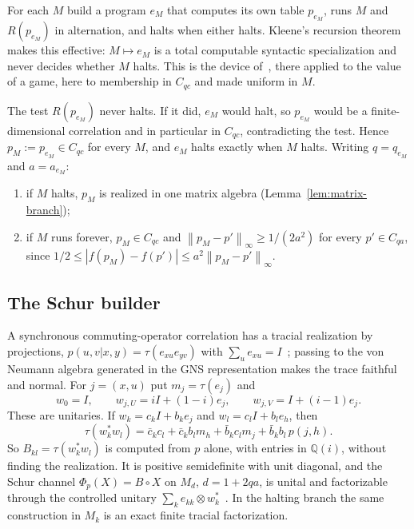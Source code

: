 \documentclass[11pt]{article}
\theoremstyle{definition}
\theoremstyle{remark}
\newcommand{\norm}[1]{\left\lVert#1\right\rVert}
\begin{document}
For each $M$ build a program $e_M$ that computes its own table $p_{e_M}$, runs $M$ and $R(p_{e_M})$ in alternation, and halts when either halts. Kleene's recursion theorem makes this effective: $M\mapsto e_M$ is a total computable syntactic specialization and never decides whether $M$ halts. This is the device of~\cite[Section~4.2]{FanizzaEtAl}, there applied to the value of a game, here to membership in $C_{qc}$ and made uniform in $M$.

The test $R(p_{e_M})$ never halts. If it did, $e_M$ would halt, so $p_{e_M}$ would be a finite-dimensional correlation and in particular in $C_{qc}$, contradicting the test. Hence $p_M:=p_{e_M}\in C_{qc}$ for every $M$, and $e_M$ halts exactly when $M$ halts. Writing $q=q_{e_M}$ and $a=a_{e_M}$:
\begin{enumerate}[label=(\roman*),itemsep=2pt]
\item if $M$ halts, $p_M$ is realized in one matrix algebra (Lemma~\ref{lem:matrix-branch});
\item if $M$ runs forever, $p_M\in C_{qc}$ and $\norm{p_M-p'}_\infty\ge1/(2a^2)$ for every $p'\in C_{qa}$, since $1/2\le|f(p_M)-f(p')|\le a^2\norm{p_M-p'}_\infty$.
\end{enumerate}

\subsection{The Schur builder}

A synchronous commuting-operator correlation has a tracial realization by projections, $p(u,v|x,y)=\tau(e_{xu}e_{yv})$ with $\sum_ue_{xu}=I$~\cite[Theorem~5.5 and Corollary~5.6]{PSSTW}; passing to the von Neumann algebra generated in the GNS representation makes the trace faithful and normal. For $j=(x,u)$ put $m_j=\tau(e_j)$ and
\[
 w_0=I,\qquad w_{j,U}=iI+(1-i)e_j,\qquad w_{j,V}=I+(i-1)e_j.
\]
These are unitaries. If $w_k=c_kI+b_ke_j$ and $w_l=c_lI+b_le_h$, then
\begin{equation}\label{eq:builder}
 \tau(w_k^*w_l)=\bar c_kc_l+\bar c_kb_lm_h+\bar b_kc_lm_j+\bar b_kb_l\,p(j,h).
\end{equation}
So $B_{kl}=\tau(w_k^*w_l)$ is computed from $p$ alone, with entries in $\mathbb Q(i)$, without finding the realization. It is positive semidefinite with unit diagonal, and the Schur channel $\Phi_p(X)=B\circ X$ on $M_d$, $d=1+2qa$, is unital and factorizable through the controlled unitary $\sum_ke_{kk}\otimes w_k^*$~\cite[Proposition~2.8]{HM2011}. In the halting branch the same construction in $M_k$ is an exact finite tracial factorization.
\end{document}
